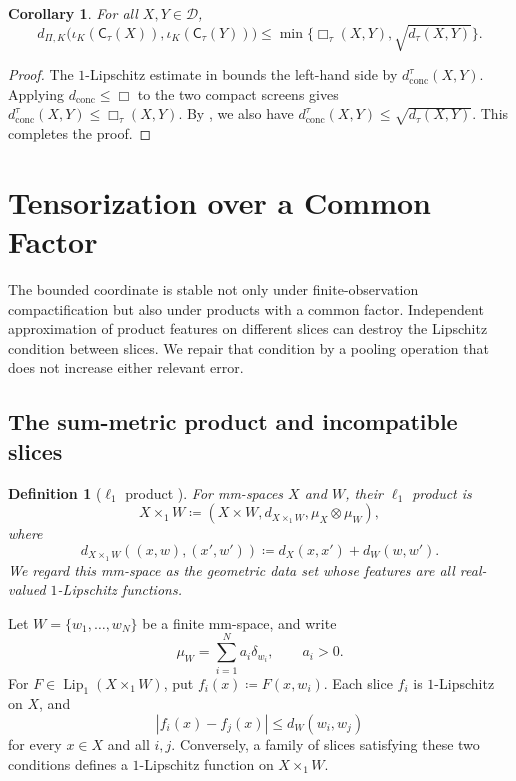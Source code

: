 \documentclass[10pt,a4paper]{amsart}
\newtheorem{corollary}[theorem]{Corollary}
\newtheorem{definition}[theorem]{Definition}
\newcommand{\D}{\mathcal D}
\newcommand{\dconc}{d_{\mathrm{conc}}}
\newcommand{\dtau}{d_{\tau}}
\begin{document}
\begin{corollary}
\label{cor:tau-pyramid-comparison}
For all $X,Y\in\D$,
\[
d_{\Pi,K}\bigl(\iota_K(\mathsf C_\tau(X)),\iota_K(\mathsf C_\tau(Y))\bigr)\leq\min\{\Box_\tau(X,Y),\sqrt{\dtau(X,Y)}\}.
\]
\end{corollary}

\begin{proof}
The $1$-Lipschitz estimate in  bounds the left-hand side by $\dconc^\tau(X,Y)$. Applying $\dconc\leq\Box$ to the two compact screens gives $\dconc^\tau(X,Y)\leq\Box_\tau(X,Y)$. By , we also have $\dconc^\tau(X,Y)\leq\sqrt{\dtau(X,Y)}$. This completes the proof.
\end{proof}

\section{Tensorization over a Common Factor}
\label{sec:tensorization}

The bounded coordinate is stable not only under finite-observation compactification but also under products with a common factor. Independent approximation of product features on different slices can destroy the Lipschitz condition between slices. We repair that condition by a pooling operation that does not increase either relevant error.

\subsection{The sum-metric product and incompatible slices}
\label{subsec:l1-slice-obstacle}

\begin{definition}[$\ell_1$ product {\cite[Definition~3.66]{shioya2024sgc}}]
\label{def:l1-product}
For mm-spaces $X$ and $W$, their \emph{$\ell_1$ product} is
\[
X\times_1W\coloneqq(X\times W,d_{X\times_1W},\mu_X\otimes\mu_W),
\]
where
\[
d_{X\times_1W}((x,w),(x',w'))\coloneqq d_X(x,x')+d_W(w,w').
\]
We regard this mm-space as the geometric data set whose features are all real-valued $1$-Lipschitz functions.
\end{definition}

Let $W=\{w_1,\ldots,w_N\}$ be a finite mm-space, and write
\[
\mu_W=\sum_{i=1}^Na_i\delta_{w_i},\qquad a_i>0.
\]
For $F\in\operatorname{Lip}_1(X\times_1W)$, put $f_i(x)\coloneqq F(x,w_i)$. Each slice $f_i$ is $1$-Lipschitz on $X$, and
\[
|f_i(x)-f_j(x)|\leq d_W(w_i,w_j)
\]
for every $x\in X$ and all $i,j$. Conversely, a family of slices satisfying these two conditions defines a $1$-Lipschitz function on $X\times_1W$.
\end{document}

